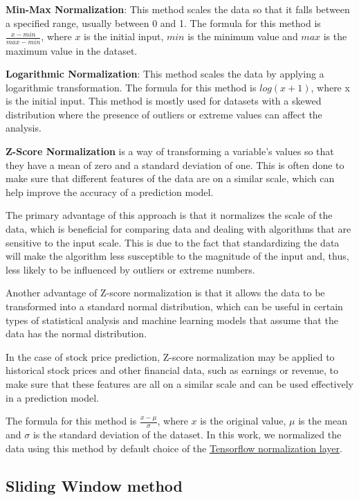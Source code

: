 \documentclass[a4paper]{article}
\begin{document}
\textbf{Min-Max Normalization}: This method scales the data so that it falls between a specified range, usually between 0 and 1. The formula for this method is $\frac{x-min}{max-min}$, where $x$ is the initial input, $min$ is the minimum value and $max$ is the maximum value in the dataset.


\textbf{Logarithmic Normalization}: This method scales the data by applying a logarithmic transformation. The formula for this method is $log(x+1)$, where x is the initial input. This method is mostly used for datasets with a skewed distribution where the presence of outliers or extreme values can affect the analysis.

\textbf{Z-Score Normalization} is a way of transforming a variable's values so that they have a mean of zero and a standard deviation of one. This is often done to make sure that different features of the data are on a similar scale, which can help improve the accuracy of a prediction model.

The primary advantage of this approach is that it normalizes the scale of the data, which is beneficial for comparing data and dealing with algorithms that are sensitive to the input scale. This is due to the fact that standardizing the data will make the algorithm less susceptible to the magnitude of the input and, thus, less likely to be influenced by outliers or extreme numbers.

Another advantage of Z-score normalization is that it allows the data to be transformed into a standard normal distribution, which can be useful in certain types of statistical analysis and machine learning models that assume that the data has the normal distribution.

In the case of stock price prediction, Z-score normalization may be applied to historical stock prices and other financial data, such as earnings or revenue, to make sure that these features are all on a similar scale and can be used effectively in a prediction model. 

The formula for this method is $\frac{x-\mu}{\sigma}$, where $x$ is the original value, $\mu$ is the mean and $\sigma$ is the standard deviation of the dataset.  In this work, we normalized the data using this method by default choice of the \hyperlink{https://www.tensorflow.org/api_docs/python/tf/keras/layers/Normalization}{Tensorflow normalization layer}. 
\subsection{Sliding Window method} \label{window}
\end{document}
